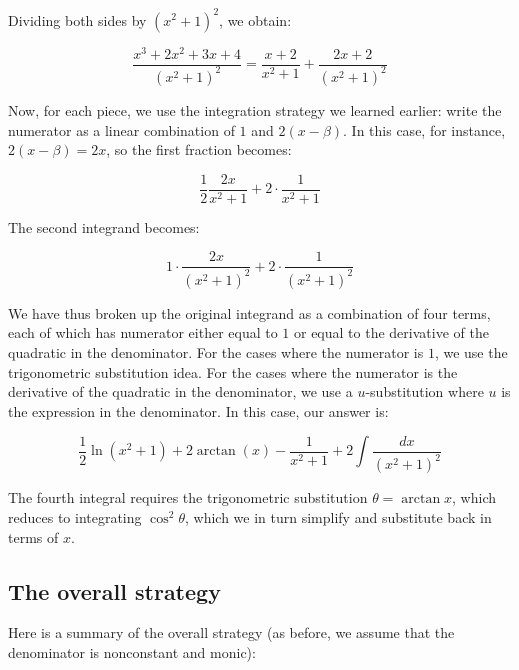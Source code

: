 \documentclass[10pt]{amsart}
\begin{document}
Dividing both sides by $(x^2 + 1)^2$, we obtain:

$$\frac{x^3 + 2x^2 + 3x + 4}{(x^2 + 1)^2} = \frac{x + 2}{x^2 + 1} + \frac{2x + 2}{(x^2 + 1)^2}$$

Now, for each piece, we use the integration strategy we learned
earlier: write the numerator as a linear combination of $1$ and $2(x -
\beta)$. In this case, for instance, $2(x - \beta) = 2x$, so the first
fraction becomes:

$$\frac{1}{2}\frac{2x}{x^2 + 1} + 2 \cdot \frac{1}{x^2 + 1}$$

The second integrand becomes:

$$1 \cdot \frac{2x}{(x^2 + 1)^2} + 2 \cdot \frac{1}{(x^2 + 1)^2}$$

We have thus broken up the original integrand as a combination of four
terms, each of which has numerator either equal to $1$ or equal to the
derivative of the quadratic in the denominator. For the cases where
the numerator is $1$, we use the trigonometric substitution idea. For
the cases where the numerator is the derivative of the quadratic in
the denominator, we use a $u$-substitution where $u$ is the expression
in the denominator. In this case, our answer is:

$$\frac{1}{2} \ln(x^2 + 1) + 2 \arctan (x) - \frac{1}{x^2 + 1} + 2 \int \frac{dx}{(x^2 + 1)^2}$$

The fourth integral requires the trigonometric substitution $\theta =
\arctan x$, which reduces to integrating $\cos^2 \theta$, which we in
turn simplify and substitute back in terms of $x$.

\subsection{The overall strategy}

Here is a summary of the overall strategy (as before, we assume that
the denominator is nonconstant and monic):
\end{document}
